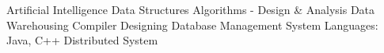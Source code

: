 
Artificial Intelligence \textbullet{} Data Structures \textbullet{} Algorithms - Design \& Analysis \textbullet{} Data Warehousing \textbullet{} Compiler Designing \textbullet{} Database Management System \textbullet{} Languages: Java, C++ \textbullet{} Distributed System